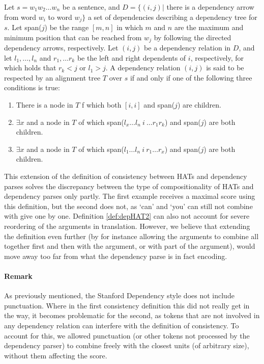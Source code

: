 \documentclass{report}
\begin{document}
\begin{definition}[]\label{def:depHAT2}
Let $s = w_1 w_2 \dots w_n$ be a sentence, and $D = \{ (i,j) |$ there is a dependency arrow from word $w_i$ to word $w_j \}$ a set of dependencies describing a dependency tree for $s$. Let span($j$) be the range $[m,n]$ in which $m$ and $n$ are the maximum and minimum position that can be reached from $w_j$ by following the directed dependency arrows, respectively. Let $(i,j)$ be a dependency relation in $D$, and let $l_1,\ldots,l_n$ and $r_1,\ldots r_k$ be the left and right dependents of $i$, respectively, for which holds that $r_k < j$ or $l_1 > j$. A dependency relation $(i,j)$ is said to be respected by an alignment tree $T$ over $s$ if and only if one of the following three conditions is true: \begin{enumerate}
\item There is a node in $T$ f which both $[i,i]$ and span($j$) are children.
\item $\exists x$  and a node in $T$ of which span($l_x\ldots l_n~i~\ldots r_1 r_k$) and span($j$) are both children.
\item $\exists x$  and a node in $T$ of which span($l_1\ldots l_n~i~r_1\ldots r_x$) and span($j$) are both children.
\end{enumerate} 
\end{definition}

This extension of the definition of consistency between HATs and dependency parses solves the discrepancy between the type of compositionality of HATs and dependency parses only partly. The first example receives a maximal score using this definition, but the second does not, as `can' and `you' can still not combine with give one by one. Definition \ref{def:depHAT2} can also not account for severe reordering of the arguments in translation. However, we believe that extending the definition even further (by for instance allowing the arguments to combine all together first and then with the argument, or with part of the argument), would move away too far from what the dependency parse is in fact encoding. %


\paragraph{Remark} As previously mentioned, the Stanford Dependency style does not include punctuation. Where in the first consistency definition this did not really get in the way, it becomes problematic for the second, as tokens that are not involved in any dependency relation can interfere with the definition of consistency. To account for this, we allowed punctuation (or other tokens not processed by the dependency parser) to combine freely with the closest units (of arbitrary size), without them affecting the score.
\end{document}
